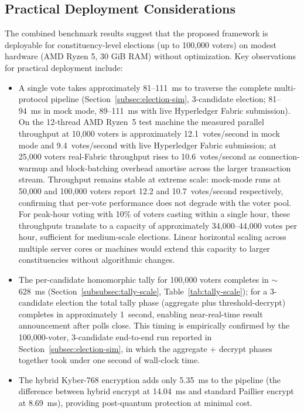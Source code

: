 \subsection{Practical Deployment Considerations}
\label{subsec:deployment}

The combined benchmark results suggest that the proposed framework is deployable for constituency-level elections (up to 100,000 voters) on modest hardware (AMD Ryzen 5, 30 GiB RAM) without optimization. Key observations for practical deployment include:

\begin{itemize}
    \item A single vote takes approximately 81--111~ms to traverse the complete multi-protocol pipeline (Section~\ref{subsec:election-sim}, 3-candidate election; 81--94~ms in mock mode, 89--111~ms with live Hyperledger Fabric submission). On the 12-thread AMD Ryzen~5 test machine the measured parallel throughput at 10{,}000 voters is approximately 12.1~votes/second in mock mode and 9.4~votes/second with live Hyperledger Fabric submission; at 25{,}000 voters real-Fabric throughput rises to 10.6~votes/second as connection-warmup and block-batching overhead amortise across the larger transaction stream. Throughput remains stable at extreme scale: mock-mode runs at 50{,}000 and 100{,}000 voters report 12.2 and 10.7~votes/second respectively, confirming that per-vote performance does not degrade with the voter pool. For peak-hour voting with 10\% of voters casting within a single hour, these throughputs translate to a capacity of approximately 34{,}000--44{,}000 votes per hour, sufficient for medium-scale elections. Linear horizontal scaling across multiple server cores or machines would extend this capacity to larger constituencies without algorithmic changes.

    \item The per-candidate homomorphic tally for 100{,}000 voters completes in $\sim$628~ms (Section~\ref{subsubsec:tally-scale}, Table~\ref{tab:tally-scale}); for a 3-candidate election the total tally phase (aggregate plus threshold-decrypt) completes in approximately 1~second, enabling near-real-time result announcement after polls close. This timing is empirically confirmed by the 100{,}000-voter, 3-candidate end-to-end run reported in Section~\ref{subsec:election-sim}, in which the aggregate $+$ decrypt phases together took under one second of wall-clock time.
    
    \item The hybrid Kyber-768 encryption adds only 5.35~ms to the pipeline (the difference between hybrid encrypt at 14.04~ms and standard Paillier encrypt at 8.69~ms), providing post-quantum protection at minimal cost.
\end{itemize}



